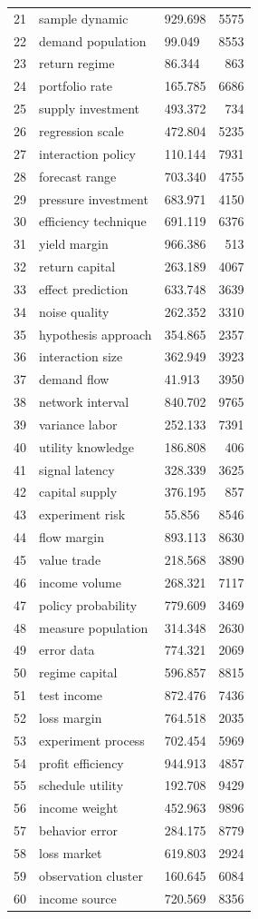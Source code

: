 \documentclass[11pt]{report}
\begin{document}
\begin{longtable}{rllr}
21 & sample dynamic & 929.698 & 5575 \\
22 & demand population & 99.049 & 8553 \\
23 & return regime & 86.344 & 863 \\
24 & portfolio rate & 165.785 & 6686 \\
25 & supply investment & 493.372 & 734 \\
26 & regression scale & 472.804 & 5235 \\
27 & interaction policy & 110.144 & 7931 \\
28 & forecast range & 703.340 & 4755 \\
29 & pressure investment & 683.971 & 4150 \\
30 & efficiency technique & 691.119 & 6376 \\
31 & yield margin & 966.386 & 513 \\
32 & return capital & 263.189 & 4067 \\
33 & effect prediction & 633.748 & 3639 \\
34 & noise quality & 262.352 & 3310 \\
35 & hypothesis approach & 354.865 & 2357 \\
36 & interaction size & 362.949 & 3923 \\
37 & demand flow & 41.913 & 3950 \\
38 & network interval & 840.702 & 9765 \\
39 & variance labor & 252.133 & 7391 \\
40 & utility knowledge & 186.808 & 406 \\
41 & signal latency & 328.339 & 3625 \\
42 & capital supply & 376.195 & 857 \\
43 & experiment risk & 55.856 & 8546 \\
44 & flow margin & 893.113 & 8630 \\
45 & value trade & 218.568 & 3890 \\
46 & income volume & 268.321 & 7117 \\
47 & policy probability & 779.609 & 3469 \\
48 & measure population & 314.348 & 2630 \\
49 & error data & 774.321 & 2069 \\
50 & regime capital & 596.857 & 8815 \\
51 & test income & 872.476 & 7436 \\
52 & loss margin & 764.518 & 2035 \\
53 & experiment process & 702.454 & 5969 \\
54 & profit efficiency & 944.913 & 4857 \\
55 & schedule utility & 192.708 & 9429 \\
56 & income weight & 452.963 & 9896 \\
57 & behavior error & 284.175 & 8779 \\
58 & loss market & 619.803 & 2924 \\
59 & observation cluster & 160.645 & 6084 \\
60 & income source & 720.569 & 8356 \\
\end{longtable}
\end{document}
